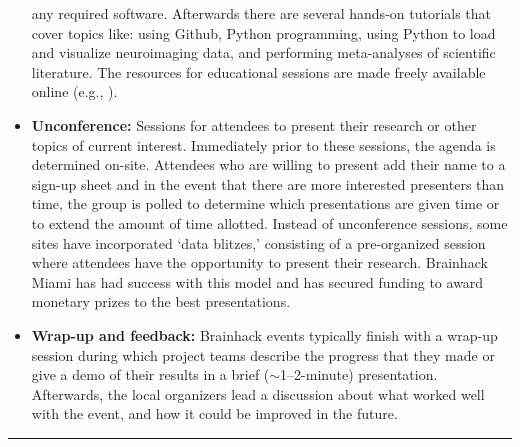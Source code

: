 \begin{table}[!ht]
\begin{itemize}
any required software. Afterwards there are several hands-on tutorials that cover topics like: using Github, Python programming, using Python to load and visualize neuroimaging data, and performing meta-analyses of scientific literature. The resources for educational sessions are made freely available online (e.g., \cite{bh101}).
    \item
        \textbf{Unconference:} Sessions for attendees to present their research or other topics of current interest. Immediately prior to these sessions, the agenda is determined on-site. Attendees who are willing to present add their name to a sign-up sheet and in the event that there are more interested presenters than time, the group is polled to determine which presentations are given time or to extend the amount of time allotted. Instead of unconference sessions, some sites have incorporated `data blitzes,' consisting of a pre-organized session where attendees have the opportunity to present their research. Brainhack Miami has had success with this model and has secured funding to award monetary prizes to the best presentations.
    \item
        \textbf{Wrap-up and feedback:} Brainhack events typically finish with a wrap-up session during which project teams describe the progress that they made or give a demo of their results in a brief ($\sim$1--2-minute) presentation. Afterwards, the local organizers lead a discussion about what worked well with the event, and how it could be improved in the future.
    \end{itemize}
\hrule %
\end{table}